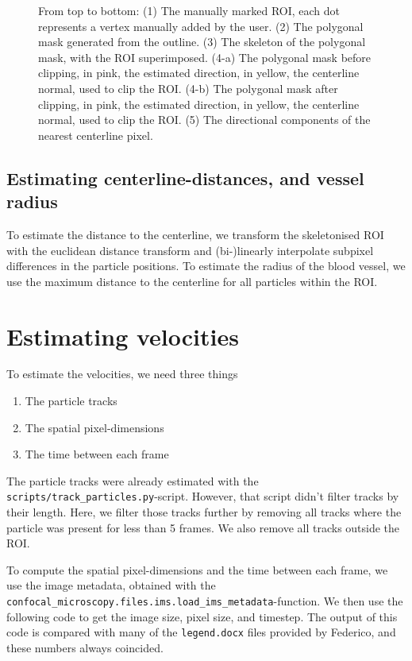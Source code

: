 \documentclass{article}
\begin{document}
\begin{figure}
    \caption{From top to bottom: 
    (1) The manually marked ROI, each dot represents a vertex manually added by the user. 
    (2) The polygonal mask generated from the outline.
    (3) The skeleton of the polygonal mask, with the ROI superimposed.
    (4-a) The polygonal mask before clipping, in pink, the estimated direction, in yellow, the centerline normal, used to clip the ROI.
    (4-b) The polygonal mask after clipping, in pink, the estimated direction, in yellow, the centerline normal, used to clip the ROI.
    (5) The directional components of the nearest centerline pixel.}
    \label{fig:roi}
\end{figure}

\subsection{Estimating centerline-distances, and vessel radius}
To estimate the distance to the centerline, we transform the skeletonised ROI with the euclidean distance transform and (bi-)linearly interpolate subpixel differences in the particle positions. To estimate the radius of the blood vessel, we use the maximum distance to the centerline for all particles within the ROI.

\section{Estimating velocities}
To estimate the velocities, we need three things

\begin{enumerate}
    \item The particle tracks
    \item The spatial pixel-dimensions
    \item The time between each frame
\end{enumerate}

The particle tracks were already estimated with the \texttt{scripts/track\_particles.py}-script. However, that script didn't filter tracks by their length. Here, we filter those tracks further by removing all tracks where the particle was present for less than 5 frames. We also remove all tracks outside the ROI.

To compute the spatial pixel-dimensions and the time between each frame, we use the image metadata, obtained with the \texttt{confocal\_microscopy.files.ims.load\_ims\_metadata}-function. We then use the following code to get the image size, pixel size, and timestep. The output of this code is compared with many of the \texttt{legend.docx} files provided by Federico, and these numbers always coincided.
\end{document}

